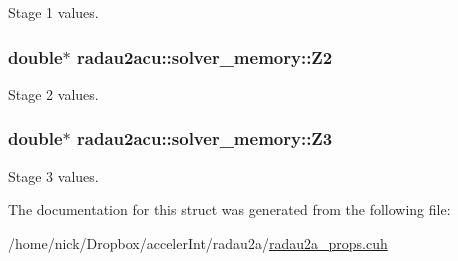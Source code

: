 Stage 1 values. 

\subsubsection[{\texorpdfstring{Z2}{Z2}}]{\setlength{\rightskip}{0pt plus 5cm}double$\ast$ radau2acu\+::solver\+\_\+memory\+::\+Z2}\hypertarget{structradau2acu_1_1solver__memory_a01e0b1a2d05bcd51d00cb1418a790d79}{}\label{structradau2acu_1_1solver__memory_a01e0b1a2d05bcd51d00cb1418a790d79}


Stage 2 values. 

\subsubsection[{\texorpdfstring{Z3}{Z3}}]{\setlength{\rightskip}{0pt plus 5cm}double$\ast$ radau2acu\+::solver\+\_\+memory\+::\+Z3}\hypertarget{structradau2acu_1_1solver__memory_ac4d01cd67d75acfe199be4d4676c0bf7}{}\label{structradau2acu_1_1solver__memory_ac4d01cd67d75acfe199be4d4676c0bf7}


Stage 3 values. 



The documentation for this struct was generated from the following file\+:\begin{DoxyCompactItemize}
\item 
/home/nick/\+Dropbox/acceler\+Int/radau2a/\hyperlink{radau2a__props_8cuh}{radau2a\+\_\+props.\+cuh}\end{DoxyCompactItemize}
